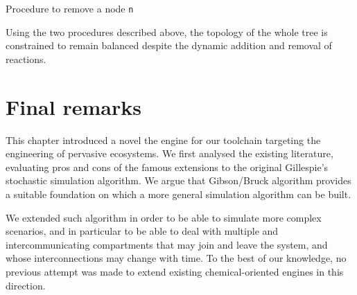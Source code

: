 \documentclass[12pt,a4paper,twoside,openright]{book}
\begin{document}
\begin{algorithm}
\begin{distribalgo}[1]
\vspace{5pt}
  \ELSE
  \ENDIF
\ENDWHILE
{}
\ELSE
\ENDIF
\caption{Procedure to remove a node \texttt{n}}
\label{algo:remnode}
\end{distribalgo}
\end{algorithm}

Using the two procedures described above, the topology of the whole tree is constrained to remain balanced despite the dynamic addition and removal of reactions.

\section{Final remarks}

This chapter introduced a novel the engine for our toolchain targeting the engineering of pervasive ecosystems.
%
We first analysed the existing literature, evaluating pros and cons of the famous extensions to the original Gillespie's stochastic simulation algorithm.
%
We argue that Gibson/Bruck algorithm provides a suitable foundation on which a more general simulation algorithm can be built.

We extended such algorithm in order to be able to simulate more complex scenarios, and in particular to be able to deal with multiple and intercommunicating compartments that may join and leave the system, and whose interconnections may change with time.
%
To the best of our knowledge, no previous attempt was made to extend existing chemical-oriented engines in this direction.
\end{document}

